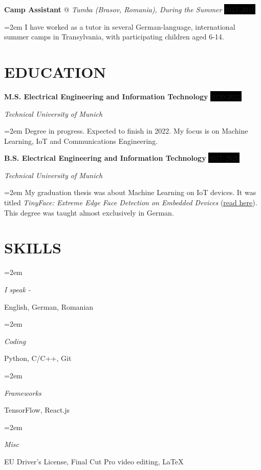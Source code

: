 \documentclass[paper=a4,fontsize=11pt]{scrartcl}
\makeatletter
\newlength{\spacebox}
\newcommand{\sepspace}{\vspace*{1em}}		%
\newcommand{\NewPart}[1]{\section*{\uppercase{#1}}}
\newcommand{\PersonalEntry}[2]{
		\noindent\hangindent=2em\hangafter=0 %
		\parbox{\spacebox}{        %
		\textit{#1}}		       %
		\hspace{1.5em} #2 \par}    %
\newcommand{\SkillsEntry}[2]{      %
		\noindent\hangindent=2em\hangafter=0 %
		\parbox{\spacebox}{        %
		\textit{#1}}			   %
		\hspace{2.5em} #2 \par}    %
\newcommand{\EducationEntry}[4]{
		\noindent \textbf{#1} \hfill      %
		\colorbox{Black}{\color{White}#2} \par  %
		\noindent \textit{#3} \par        %
		\noindent\hangindent=2em\hangafter=0 \small #4 %
		\normalsize \par}
\newcommand{\WorkEntry}[4]{				  %
		\noindent \textbf{#1} @ \textit{#3} \hfill      %
		\colorbox{Black}{\color{White}#2} \par  %
		\noindent\hangindent=2em\hangafter=0 \small #4 %
		\normalsize \par}
\makeatother
\begin{document}
\WorkEntry{Camp Assistant}{2017-2019}{Tumba (Brasov, Romania), During the Summer}{I have worked as a tutor in several German-language, international summer camps in Transylvania, with participating children aged 6-14.}
\sepspace


\NewPart{Education}{}

\EducationEntry{M.S. Electrical Engineering and Information Technology}{2020-2022}{Technical University of Munich}{Degree in progress. Expected to finish in 2022. My focus is on Machine Learning, IoT and Communications Engineering.}
\sepspace

\EducationEntry{B.S. Electrical Engineering and Information Technology}{2017-2020}{Technical University of Munich}{My graduation thesis was about Machine Learning on IoT devices. It was titled \textit{TinyFace: Extreme Edge Face Detection on Embedded Devices} (\href{https://github.com/munober/thesis/blob/master/digital_edition.pdf}{\underline{read here}}). This degree was taught almost exclusively in German.}

\NewPart{Skills}{}

\SkillsEntry{I speak - }{English, German, Romanian}
\SkillsEntry{Coding}{Python, \textsc{C/C++}, Git}
\SkillsEntry{Frameworks}{TensorFlow, React.js}
\SkillsEntry{Misc}{EU Driver's License, Final Cut Pro video editing, \LaTeX}


\end{document}
